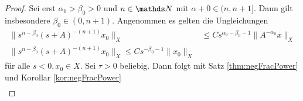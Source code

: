 \begin{proof}
Sei erst $\alpha_0 > \beta_0 > 0$ und $n \in \N$ mit $\alpha+0 \in (n, n + 1]$. 
Dann gilt insbesondere $\beta_0 \in (0,n+1)$.
Angenommen es gelten die Ungleichungen
\begin{align}
  \|s^{n - \beta_0} (s + A)^{-(n + 1)} x_0 \|_X &
  \leq C s^{\alpha_0 - \beta_0 - 1} \|A^{-\alpha_0} x\|_X \tag{1} \\
  \|s^{n - \beta_0} (s+ A)^{-(n + 1)} x_0 \|_X \leq C s^{-\beta_0 - 1} \|x_0\|_X \tag{2}
\end{align}
für alle $s < 0, x_0 \in X$. 
Sei $\tau > 0$ beliebig. Dann folgt mit Satz \ref{thm:negFracPower} und Korollar \ref{kor:negFracPower}
\begin{align*}
\end{align*}
\end{proof}
